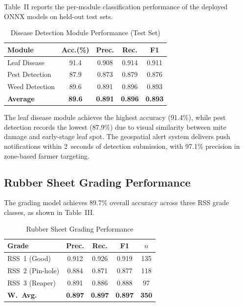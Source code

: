 \documentclass[10pt, conference]{IEEEtran}
\begin{document}
Table~II reports the per-module classification performance of the
deployed ONNX models on held-out test sets.

\begin{table}[!t]
\centering
\caption{Disease Detection Module Performance (Test Set)}
\label{tab:disease}
\begin{tabular}{lcccc}
\toprule
\textbf{Module} & \textbf{Acc.(\%)} & \textbf{Prec.} & \textbf{Rec.} & \textbf{F1} \\
\midrule
Leaf Disease     & 91.4 & 0.908 & 0.914 & 0.911 \\
Pest Detection   & 87.9 & 0.873 & 0.879 & 0.876 \\
Weed Detection   & 89.6 & 0.891 & 0.896 & 0.893 \\
\midrule
\textbf{Average} & \textbf{89.6} & \textbf{0.891} & \textbf{0.896} & \textbf{0.893} \\
\bottomrule
\end{tabular}
\end{table}

The leaf disease module achieves the highest accuracy (91.4\%), while
pest detection records the lowest (87.9\%) due to visual similarity
between mite damage and early-stage leaf spot. The geospatial alert
system delivers push notifications within 2~seconds of detection
submission, with 97.1\% precision in zone-based farmer targeting.

\subsection{Rubber Sheet Grading Performance}

The grading model achieves 89.7\% overall accuracy across three RSS
grade classes, as shown in Table~III.

\begin{table}[!t]
\centering
\caption{Rubber Sheet Grading Performance}
\label{tab:grading}
\begin{tabular}{lcccc}
\toprule
\textbf{Grade} & \textbf{Prec.} & \textbf{Rec.} & \textbf{F1} & \textbf{$n$} \\
\midrule
RSS~1 (Good)     & 0.912 & 0.926 & 0.919 & 135 \\
RSS~2 (Pin-hole) & 0.884 & 0.871 & 0.877 & 118 \\
RSS~3 (Reaper)   & 0.891 & 0.886 & 0.888 & 97 \\
\midrule
\textbf{W.~Avg.} & \textbf{0.897} & \textbf{0.897} & \textbf{0.897} & \textbf{350} \\
\bottomrule
\end{tabular}
\end{table}
\end{document}
